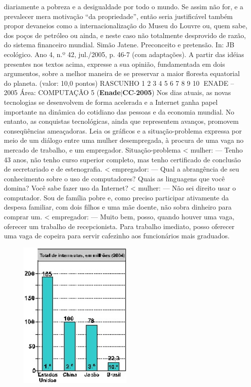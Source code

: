 \documentclass{exam}
\begin{document}
\begin{questions}
diariamente a pobreza e a desigualdade por todo o mundo.
Se assim não for, e a prevalecer mera motivação “da propriedade”, então seria justificável também propor devaneios
como a internacionalização do Museu do Louvre ou, quem sabe, dos poços de petróleo ou ainda, e neste caso não totalmente
desprovido de razão, do sistema financeiro mundial.
Simão Jatene. Preconceito e pretensão. In: JB ecológico. Ano 4, n.º 42, jul./2005, p. 46-7 (com adaptações).
A partir das idéias presentes nos textos acima, expresse a sua opinião, fundamentada em dois argumentos, sobre
a melhor maneira de se preservar a maior floresta equatorial do planeta.
(valor: 10,0 pontos)
RASCUNHO
1
2
3
4
5
6
7
8
9
10
ENADE – 2005 Área: COMPUTAÇÃO 5
\question (\textbf{Enade}$|$\textbf{CC}-\textbf{2005}) Nos dias atuais, as novas tecnologias se desenvolvem de forma acelerada e a Internet ganha papel importante
na dinâmica do cotidiano das pessoas e da economia mundial. No entanto, as conquistas tecnológicas, ainda que
representem avanços, promovem conseqüências ameaçadoras.
Leia os gráficos e a situação-problema expressa por meio de um diálogo entre uma mulher desempregada, à procura de uma vaga no
mercado de trabalho, e um empregador.
Situação-problema
< mulher:
— Tenho 43 anos, não tenho curso superior
completo, mas tenho certificado de conclusão de
secretariado e de estenografia.
< empregador:
— Qual a abrangência de seu conhecimento sobre o
uso de computadores? Quais as linguagens que
você domina? Você sabe fazer uso da Internet?
< mulher:
— Não sei direito usar o computador. Sou de
família pobre e, como preciso participar
ativamente da despesa familiar, com dois filhos
e uma mãe doente, não sobra dinheiro para
comprar um.
< empregador:
— Muito bem, posso, quando houver uma vaga,
oferecer um trabalho de recepcionista. Para
trabalho imediato, posso oferecer uma vaga de
copeira para servir cafezinho aos funcionários
mais graduados.
\begin{figure}[H]
	\begin{center}
		\includegraphics[width=0.5\textwidth]{CIENCIA_DA_COMPUTACAO_Prova2005-utf8_figuras/fig-0007.jpg}

\end{center}
\end{figure}
\end{questions}
\end{document}
